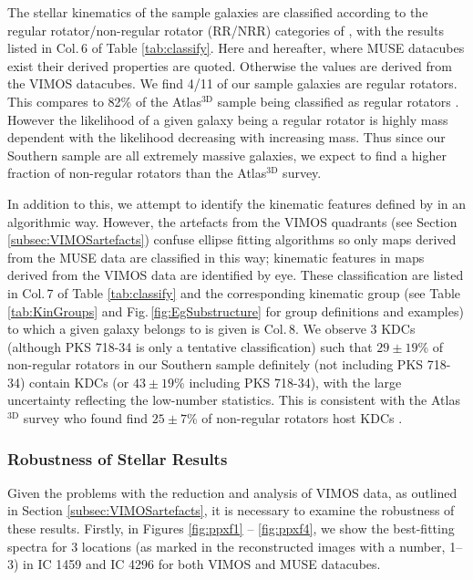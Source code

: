 		The stellar kinematics of the sample galaxies are classified according to the regular rotator/non-regular rotator (RR/NRR) categories of \citet{Krajnovic2011}, with the results listed in Col.\,6 of Table \ref{tab:classify}. Here and hereafter, where MUSE datacubes exist their derived properties are quoted. Otherwise the values are derived from the VIMOS datacubes. We find 4/11 of our sample galaxies are regular rotators. This compares to 82\% of the Atlas$^\text{3D}$ sample being classified as regular rotators \citep{Krajnovic2011}. However the likelihood of a given galaxy being a regular rotator is highly mass dependent with the likelihood decreasing with increasing mass. Thus since our Southern sample are all extremely massive galaxies, we expect to find a higher fraction of non-regular rotators than the Atlas$^\text{3D}$ survey. 

		In addition to this, we attempt to identify the kinematic features defined by \citet{Krajnovic2011} in an algorithmic way. However, the artefacts from the VIMOS quadrants (see Section \ref{subsec:VIMOSartefacts}) confuse ellipse fitting algorithms so only maps derived from the MUSE data are classified in this way; kinematic features in maps derived from the VIMOS data are identified by eye. These classification are listed in Col.\,7 of Table \ref{tab:classify} and the corresponding kinematic group (see Table \ref{tab:KinGroups} and Fig.\,\ref{fig:EgSubstructure} for group definitions and examples) to which a given galaxy belongs to is given is Col.\,8. We observe 3 KDCs (although PKS 718-34 is only a tentative classification) such that $29\pm19$\% of non-regular rotators in our Southern sample definitely (not including PKS 718-34) contain KDCs (or $43\pm19$\% including PKS 718-34), with the large uncertainty reflecting the low-number statistics. This is consistent with the Atlas$^\text{3D}$ survey who found find $25\pm7$\% of non-regular rotators host KDCs \citep{Krajnovic2011}.

		\subsubsection{Robustness of Stellar Results}
			\label{subsubsec:RobustKin}
			Given the problems with the reduction and analysis of VIMOS data, as outlined in Section \ref{subsec:VIMOSartefacts}, it is necessary to examine the robustness of these results. Firstly, in Figures \ref{fig:ppxf1} -- \ref{fig:ppxf4}, we show the best-fitting spectra for 3 locations (as marked in the reconstructed images with a number, 1--3) in IC 1459 and IC 4296 for both VIMOS and MUSE datacubes. 

